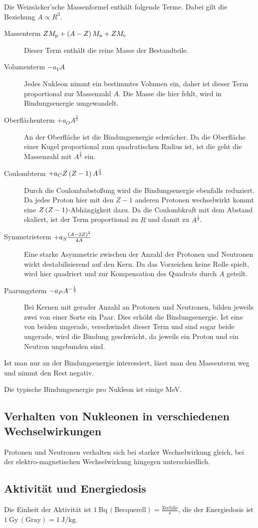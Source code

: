 Die Weizsäcker'sche Massenformel enthält folgende Terme. Dabei gilt die
Beziehung $A \propto R^3$.
\begin{description}
    \item[Massenterm $ZM_\text{p}+\del{A-Z}M_\text{n}+ZM_\text{e}$]
        Dieser Term enthält die reine Masse der Bestandteile.
    \item[Volumenterm $-a_VA$]
        Jedes Nukleon nimmt ein bestimmtes Volumen ein, daher ist dieser Term
        proportional zur Massenzahl $A$. Die Masse die hier fehlt, wird in
        Bindungsenergie umgewandelt.
    \item[Oberflächenterm $+a_OA^{\frac23}$]
        An der Oberfläche ist die Bindungsenergie schwächer. Da die Oberfläche
        einer Kugel proportional zum quadratischen Radius ist, ist die geht die
        Massenzahl mit $A^{\frac23}$ ein.
    \item[Coulombterm $+a_CZ\del{Z-1}A^{\frac13}$]
        Durch die Coulombabstoßung wird die Bindungsenergie ebenfalls
        reduziert. Da jedes Proton hier mit den $Z-1$ anderen Protonen
        wechselwirkt kommt eine $Z\del{Z-1}$-Abhängigkeit dazu. Da die
        Coulombkraft mit dem Abstand skaliert, ist der Term proportional zu $R$
        und damit zu $A^{\frac13}$.
    \item[Symmetrieterm $+a_S\frac{\del{A-2Z}^2}{4A}$]
        Eine starke Asymmetrie zwischen der Anzahl der Protonen und Neutronen
        wirkt destabilisierend auf den Kern. Da das Vorzeichen keine Rolle
        spielt, wird hier quadriert und zur Kompensation des Quadrats durch $A$
        geteilt.
    \item[Paarungsterm $-a_PA^{-\frac 12}$]
        Bei Kernen mit gerader Anzahl an Protonen und Neutronen, bilden jeweils
        zwei von einer Sorte ein Paar. Dies erhöht die Bindungsenergie. Ist
        eine von beiden ungerade, verschwindet dieser Term und sind sogar beide
        ungerade, wird die Bindung geschwächt, da jeweils ein Proton und ein
        Neutron ungebunden sind.
\end{description}
Ist man nur an der Bindungsenergie interessiert, lässt man den Massenterm weg und nimmt den Rest negativ.

Die typische Bindungsenergie pro Nukleon ist einige \si{\mega\electronvolt}.

\subsection{Verhalten von Nukleonen in verschiedenen Wechselwirkungen}

Protonen und Neutronen verhalten sich bei starker Wechselwirkung gleich, bei der elektro-magnetischen Wechselwirkung hingegen unterschiedlich.

\subsection{Aktivität und Energiedosis}

Die Einheit der Aktivität ist $\SI{1}{\becquerel}\,(\text{Becquerell}) =
\frac{\text{Zerfälle}}{\si{\second}}$, die der Energiedosis ist 
$\SI{1}{\gray}\, (\text{Gray})= \SI{1}{\joule\per\kilo\gram}$.

